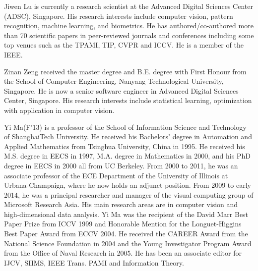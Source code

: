 \documentclass[10pt,journal,compsoc]{IEEEtran}
\begin{document}
\begin{IEEEbiography}
{Jiwen Lu} is currently a research scientist at the Advanced Digital Sciences Center (ADSC), Singapore. His research interests include computer vision, pattern recognition, machine learning, and biometrics. He has authored/co-authored more than 70 scientific papers in peer-reviewed journals and conferences including some top venues such as the TPAMI, TIP, CVPR and ICCV. He is a member of the IEEE.
\end{IEEEbiography}



\begin{IEEEbiography}
{Zinan Zeng} received the master degree and B.E. degree with First Honour from the School of Computer Engineering, Nanyang Technological University, Singapore. He is now a senior software engineer in Advanced Digital Sciences Center, Singapore. His research interests include statistical learning, optimization with application in computer vision.
\end{IEEEbiography}



\begin{IEEEbiography}
{Yi Ma}(F'13) is a  professor of the School of Information Science and
Technology of ShanghaiTech University. He received his Bachelors' degree in Automation and Applied
Mathematics from Tsinghua University, China in 1995. He
received his M.S. degree in EECS in 1997, M.A. degree in
Mathematics in 2000, and his PhD degree in EECS in 2000 all from
UC Berkeley. From 2000 to 2011, he was an associate professor of the ECE
Department of the University of Illinois at Urbana-Champaign, where he now holds an adjunct position.
From 2009 to early 2014, he was a principal researcher and manager of the visual computing
group of Microsoft Research Asia. His main research areas are in computer vision and high-dimensional data analysis.
Yi Ma was the recipient of the David Marr Best Paper Prize from ICCV 1999 and Honorable Mention for the Longuet-Higgins Best
Paper Award from ECCV 2004. He received the CAREER Award from the National Science Foundation
in 2004 and the Young Investigator Program Award from the
Office of Naval Research in 2005. He has been an associate editor for IJCV, SIIMS, IEEE Trans. PAMI and Information Theory.

\end{IEEEbiography}
\end{document}
